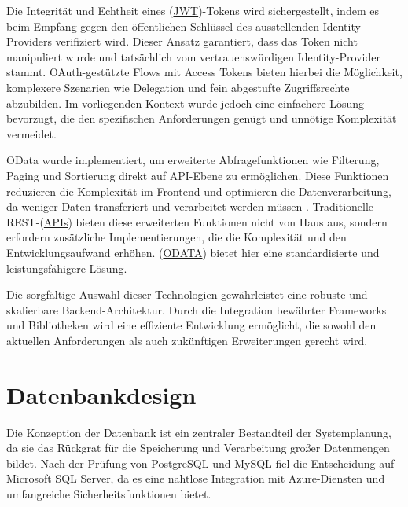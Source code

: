 Die Integrität und Echtheit eines (\hyperref[abkuerzungen]{JWT})-Tokens wird sichergestellt, indem es beim Empfang gegen den öffentlichen Schlüssel des ausstellenden Identity-Providers verifiziert wird. Dieser Ansatz garantiert, dass das Token nicht manipuliert wurde und tatsächlich vom vertrauenswürdigen Identity-Provider stammt. OAuth-gestützte Flows mit Access Tokens bieten hierbei die Möglichkeit, komplexere Szenarien wie Delegation und fein abgestufte Zugriffsrechte abzubilden. Im vorliegenden Kontext wurde jedoch eine einfachere Lösung bevorzugt, die den spezifischen Anforderungen genügt und unnötige Komplexität vermeidet.

OData wurde implementiert, um erweiterte Abfragefunktionen wie Filterung, Paging und Sortierung direkt auf API-Ebene zu ermöglichen. Diese Funktionen reduzieren die Komplexität im Frontend und optimieren die Datenverarbeitung, da weniger Daten transferiert und verarbeitet werden müssen \cite{odata2022}. Traditionelle REST-(\hyperref[abkuerzungen]{APIs}) bieten diese erweiterten Funktionen nicht von Haus aus, sondern erfordern zusätzliche Implementierungen, die die Komplexität und den Entwicklungsaufwand erhöhen. (\hyperref[abkuerzungen]{ODATA}) bietet hier eine standardisierte und leistungsfähigere Lösung.

Die sorgfältige Auswahl dieser Technologien gewährleistet eine robuste und skalierbare Backend-Architektur. Durch die Integration bewährter Frameworks und Bibliotheken wird eine effiziente Entwicklung ermöglicht, die sowohl den aktuellen Anforderungen als auch zukünftigen Erweiterungen gerecht wird.

\section{Datenbankdesign} Die Konzeption der Datenbank ist ein zentraler Bestandteil der Systemplanung, da sie das Rückgrat für die Speicherung und Verarbeitung großer Datenmengen bildet. Nach der Prüfung von PostgreSQL und MySQL fiel die Entscheidung auf Microsoft SQL Server, da es eine nahtlose Integration mit Azure-Diensten und umfangreiche Sicherheitsfunktionen bietet.

